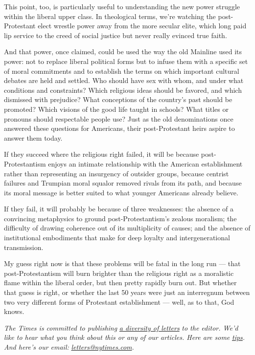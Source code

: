 This point, too, is particularly useful to understanding the new power
struggle within the liberal upper class. In theological terms, we're
watching the post-Protestant elect wrestle power away from the more
secular elite, which long paid lip service to the creed of social
justice but never really evinced true faith.

And that power, once claimed, could be used the way the old Mainline
used its power: not to replace liberal political forms but to infuse
them with a specific set of moral commitments and to establish the terms
on which important cultural debates are held and settled. Who should
have sex with whom, and under what conditions and constraints? Which
religious ideas should be favored, and which dismissed with prejudice?
What conceptions of the country's past should be promoted? Which visions
of the good life taught in schools? What titles or pronouns should
respectable people use? Just as the old denominations once answered
these questions for Americans, their post-Protestant heirs aspire to
answer them today.

If they succeed where the religious right failed, it will be because
post-Protestantism enjoys an intimate relationship with the American
establishment rather than representing an insurgency of outsider groups,
because centrist failures and Trumpian moral squalor removed rivals from
its path, and because its moral message is better suited to what younger
Americans already believe.

If they fail, it will probably be because of three weaknesses: the
absence of a convincing metaphysics to ground post-Protestantism's
zealous moralism; the difficulty of drawing coherence out of its
multiplicity of causes; and the absence of institutional embodiments
that make for deep loyalty and intergenerational transmission.

My guess right now is that these problems will be fatal in the long run
--- that post-Protestantism will burn brighter than the religious right
as a moralistic flame within the liberal order, but then pretty rapidly
burn out. But whether that guess is right, or whether the last 50 years
were just an interregnum between two very different forms of Protestant
establishment --- well, as to that, God knows.

\emph{The Times is committed to publishing}
\href{https://www.nytimes.com/2019/01/31/opinion/letters/letters-to-editor-new-york-times-women.html}{\emph{a
diversity of letters}} \emph{to the editor. We'd like to hear what you
think about this or any of our articles. Here are some}
\href{https://help.nytimes.com/hc/en-us/articles/115014925288-How-to-submit-a-letter-to-the-editor}{\emph{tips}}\emph{.
And here's our email:}
\href{mailto:letters@nytimes.com}{\emph{letters@nytimes.com}}\emph{.}

